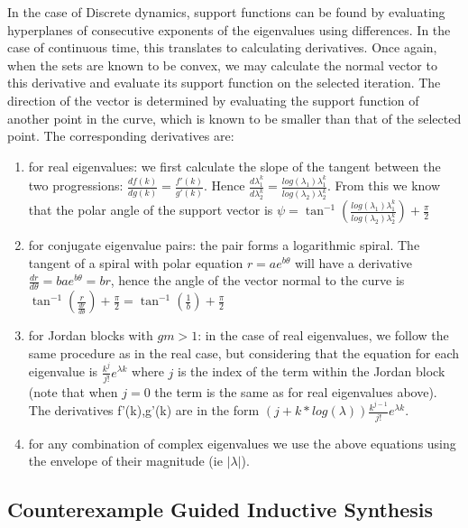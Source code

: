 \documentclass[twocolumn]{autart}    %
\begin{document}
In the case of Discrete dynamics, support functions can be found by
evaluating hyperplanes of consecutive exponents of the eigenvalues using
differences.  In the case of continuous time, this translates to calculating
derivatives.  Once again, when the sets are known to be convex, we may
calculate the normal vector to this derivative and evaluate its support
function on the selected iteration.  The direction of the vector is
determined by evaluating the support function of another point in the curve,
which is known to be smaller than that of the selected point.  The
corresponding derivatives are:
%
\begin{enumerate}
%
\item for real eigenvalues: we first calculate the slope of the tangent
between the two progressions: $\frac{d f(k)}{d g(k)}=\frac{f'(k)}{g'(k)}$. 
Hence $\frac{d \lambda_1^k}{d \lambda_2^k}=\frac{log(\lambda_1)
\lambda_1^k}{log(\lambda_2) \lambda_2^k}$.  From this we know that the polar
angle of the support vector is $\psi = \tan^{-1}(\frac{log(\lambda_1)
\lambda_1^k}{log(\lambda_2) \lambda_2^k})+\frac{\pi}{2}$
%
\item for conjugate eigenvalue pairs: the pair forms a logarithmic spiral. 
The tangent of a spiral with polar equation $r=a e^{b\theta}$ will have a
derivative $\frac{d r}{d \theta}=b a e^{b\theta}=b r$, hence the angle of
the vector normal to the curve is $\tan^{-1}(\frac{r}{\frac{d r}{d
\theta}})+\frac{\pi}{2}=\tan^{-1}(\frac{1}{b})+\frac{\pi}{2}$
%
\item for Jordan blocks with $gm>1$: in the case of real eigenvalues, we
follow the same procedure as in the real case, but considering that the
equation for each eigenvalue is $\frac{k^j}{j!}e^{\lambda k}$ where $j$ is
the index of the term within the Jordan block (note that when $j=0$ the term
is the same as for real eigenvalues above).  The derivatives f'(k),g'(k) are
in the form $(j+k*log(\lambda))\frac{k^{j-1}}{j!}e^{\lambda k}$.
%
\item for any combination of complex eigenvalues we use the above equations
using the envelope of their magnitude (ie $|\lambda|$).
%
\end{enumerate}


\subsection{Counterexample Guided Inductive Synthesis} 
\label{ssec:cegis}
\end{document}
